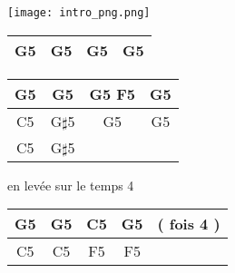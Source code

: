 \texttt{[image: intro\_png.png]}

\begin{tabular}{|c|c|c|c|}
    \hline
    G5 & G5 & G5 & G5 \\
    \hline
\end{tabular}

\begin{tabular}{|c|c|c|c|}
    \hline
    G5 & G5         & G5 F5 & G5 \\
    \hline
    C5 & G$\sharp$5 & G5    & G5 \\
    \hline
    C5 & G$\sharp$5 &       &    \\
    \hline
\end{tabular}


en levée sur le temps 4

\begin{tabular}{|c|c|c|c|c|}
    \hline
    G5 & G5 & C5 & G5 & ( fois 4 ) \\
    \hline
    C5 & C5 & F5 & F5 &            \\
    \hline
\end{tabular}

